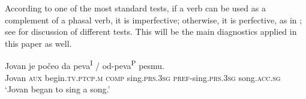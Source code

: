 \documentclass[output=paper,colorlinks,citecolor=brown]{langscibook}
\begin{document}
\ea \label{mil:ex:AspectualMorphologyOfSCverb}
 \label{mil:ex:AspectualMorphologyOfSCverb-c}
 \label{mil:ex:AspectualMorphologyOfSCverb-d}
\z
\z

\noindent According to one of the most standard tests, if a verb can be used as a complement of a phasal verb, it is imperfective; otherwise, it is perfective, as in ; see \citet{Borik_2006, Łazorczyk2010, Zinova2021} for discussion of different tests. This will be the main diagnostics applied in this paper as well.

\ea \label{mil:ex:imperfectivityTest}
\gll Jovan je počeo da peva\textsuperscript{I} / \minsp{*} od-peva\textsuperscript{P} pesmu.\\
     Jovan 
     \textsc{aux}
     begin.\textsc{tv.ptcp.m}
     \textsc{comp}
     sing.\textsc{prs.3sg}
    {} {}
     \textsc{pref}-sing.\textsc{prs.3sg}
     song.\textsc{acc.sg}\\
\glt `Jovan began to sing a song.'
\z
\end{document}
